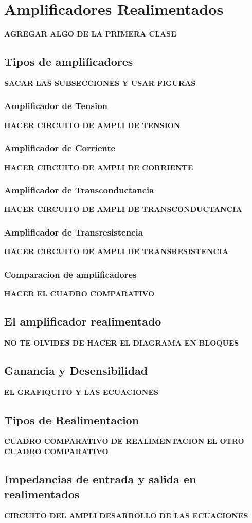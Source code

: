 \chapter{Amplificadores Realimentados}
\textbf{AGREGAR ALGO DE LA PRIMERA CLASE}

\section{Tipos de amplificadores}
\textbf{SACAR LAS SUBSECCIONES Y USAR FIGURAS}
\subsection{Amplificador de Tension}
\textbf{HACER CIRCUITO DE AMPLI DE TENSION}

\subsection{Amplificador de Corriente}
\textbf{HACER CIRCUITO DE AMPLI DE CORRIENTE}

\subsection{Amplificador de Transconductancia}
\textbf{HACER CIRCUITO DE AMPLI DE TRANSCONDUCTANCIA}

\subsection{Amplificador de Transresistencia}
\textbf{HACER CIRCUITO DE AMPLI DE TRANSRESISTENCIA}

\subsection{Comparacion de amplificadores}
\textbf{HACER EL CUADRO COMPARATIVO}


\section{El amplificador realimentado}
\textbf{NO TE OLVIDES DE HACER EL DIAGRAMA EN BLOQUES}


\section{Ganancia y Desensibilidad}
\textbf{EL GRAFIQUITO Y LAS ECUACIONES}


\section{Tipos de Realimentacion}
\textbf{CUADRO COMPARATIVO DE REALIMENTACION}
\textbf{EL OTRO CUADRO COMPARATIVO}


\section{Impedancias de entrada y salida en realimentados}
\textbf{CIRCUITO DEL AMPLI}
\textbf{DESARROLLO DE LAS ECUACIONES}
